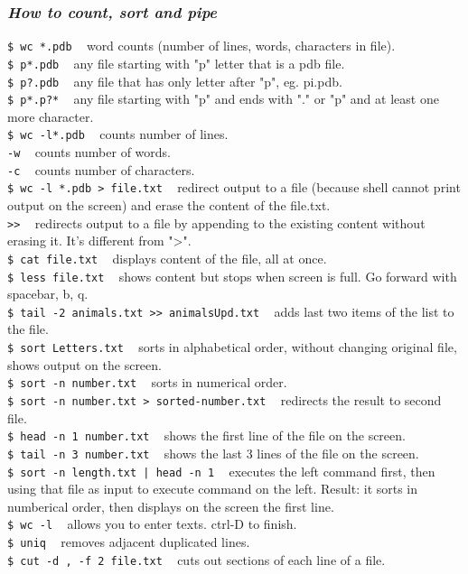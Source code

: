 \documentclass{article}
\begin{document}
\subsubsection{\small\textsl{How to count, sort and pipe}}
\texttt{\$ wc *.pdb} ~ word counts (number of lines, words, characters in file). \\
\texttt{\$ p*.pdb} ~	any file starting with "p" letter that is a pdb file.\\
\texttt{\$ p?.pdb} ~ any file that has only letter after "p", eg. pi.pdb.\\
\texttt{\$ p*.p?*} ~	 any file starting with "p" and ends with "." or "p" and at least one more character.\\
\texttt{\$ wc -l*.pdb} ~	 counts number of lines.\\
\indent\indent \texttt{-w} ~	counts number of words.\\ 
\indent\indent \texttt{-c} ~	counts number of characters.\\
\texttt{\$ wc -l *.pdb > file.txt} ~	 redirect output to a file (because shell cannot print output on the screen) and erase the content of the file.txt. \\
\texttt{>>} ~	redirects output to a file by appending to the existing content without erasing it. It's different from ">".\\
\texttt{\$ cat file.txt} ~ displays content of the file, all at once.\\
\texttt{\$ less file.txt} ~	shows content but stops when screen is full. Go forward with spacebar, b, q. \\
\texttt{\$ tail -2 animals.txt >> animalsUpd.txt} ~	adds last two items of the list to the file.\\
\texttt{\$ sort Letters.txt} ~  sorts in alphabetical order, without changing original file, shows output on the screen.\\
\texttt{\$ sort -n number.txt} ~	sorts in numerical order.\\
\texttt{\$ sort -n number.txt > sorted-number.txt} ~ redirects the result to second file.\\
\texttt{\$ head -n 1 number.txt} ~ shows the first line of the file on the screen.\\
\texttt{\$ tail -n 3 number.txt} ~ shows the last 3 lines of the file on the screen.\\
\texttt{\$ sort -n length.txt | head -n 1} ~  executes the left command first, then using that file as input to execute command on the left. Result: it sorts in numberical order, then displays on the screen the first line.\\
\texttt{\$ wc -l} ~ 	allows you to enter texts. ctrl-D to finish.\\
\texttt{\$ uniq} ~ removes adjacent duplicated lines.\\
\texttt{\$ cut -d , -f 2 file.txt} ~ cuts out sections of each line of a file.\\
\end{document}
